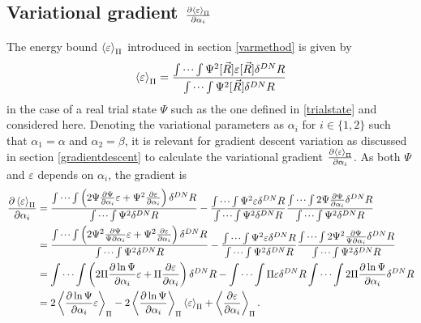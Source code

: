 \documentclass[a4paper,8pt]{article}
\begin{document}
\subsection{Variational gradient $\frac{\partial\ev{\varepsilon}_\Pi}{\partial\alpha_i}$} \label{derVargrad}
The energy bound $\ev{\varepsilon}_\Pi$ introduced in section \ref{varmethod} is given by
\begin{equation}
\ev{\varepsilon}_\Pi = \frac{\idotsint \Psi^2[\vec{R}] \varepsilon[\vec{R}] \delta^{DN}R}{\idotsint \Psi^2[\vec{R}]\delta^{DN}R} \label{energybound}
\end{equation}
in the case of a real trial state $\Psi$ such as the one defined in \eqref{trialstate} and considered here. Denoting the variational parameters as $\alpha_i$ for $i \in \{1,2\}$ such that $\alpha_1 = \alpha$ and $\alpha_2 = \beta$, it is relevant for gradient descent variation as discussed in section \ref{gradientdescent} to calculate the variational gradient $\frac{\partial \ev{\varepsilon}_\Pi}{\partial \alpha_i}$. As both $\Psi$ and $\varepsilon$ depends on $\alpha_i$, the gradient is
\begin{align}
\frac{\partial\ev{\varepsilon}_\Pi}{\partial\alpha_i} &= \frac{\idotsint \left(2\Psi\frac{\partial\Psi}{\partial\alpha_i}\varepsilon+\Psi^2\frac{\partial\varepsilon}{\partial\alpha_i}\right)\delta^{DN}R}{\idotsint \Psi^2 \delta^{DN}R} - \frac{\idotsint \Psi^2\varepsilon \delta^{DN}R}{\idotsint \Psi^2 \delta^{DN}R}\frac{\idotsint 2\Psi\frac{\partial\Psi}{\partial\alpha_i}\delta^{DN}R}{\idotsint \Psi^2 \delta^{DN}R} \nonumber\\
&= \frac{\idotsint \left(2\Psi^2\frac{\partial\Psi}{\Psi\partial\alpha_i}\varepsilon+\Psi^2\frac{\partial\varepsilon}{\partial\alpha_i}\right)\delta^{DN}R}{\idotsint \Psi^2 \delta^{DN}R} - \frac{\idotsint \Psi^2\varepsilon \delta^{DN}R}{\idotsint \Psi^2 \delta^{DN}R}\frac{\idotsint 2\Psi^2\frac{\partial\Psi}{\Psi\partial\alpha_i}\delta^{DN}R}{\idotsint \Psi^2 \delta^{DN}R} \nonumber\\
&= \idotsint \left(2\Pi\frac{\partial\ln\Psi}{\partial\alpha_i}\varepsilon+\Pi\frac{\partial\varepsilon}{\partial\alpha_i}\right)\delta^{DN}R - \idotsint \Pi\varepsilon \delta^{DN}R \idotsint 2\Pi\frac{\partial\ln\Psi}{\partial\alpha_i} \delta^{DN}R \nonumber\\
&= 2\ev{\frac{\partial\ln\Psi}{\partial\alpha_i}\varepsilon}_\Pi-2\ev{\frac{\partial\ln\Psi}{\partial\alpha_i}}_\Pi\ev{\varepsilon}_\Pi+\ev{\frac{\partial\varepsilon}{\partial\alpha_i}}_\Pi. 
\end{align}
\end{document}
